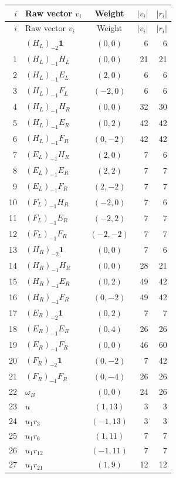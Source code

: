 \begingroup\small
\begin{longtable}{@{}rlcrr@{}}
\toprule $i$&Raw vector $v_i$&Weight&$|v_i|$&$|r_i|$\\\midrule\endfirsthead
\toprule $i$&Raw vector $v_i$&Weight&$|v_i|$&$|r_i|$\\\midrule\endhead
\bottomrule\endfoot
0 & $(H_L)_{-2}\mathbf1$ & $(0,0)$ & 6 & 6\\
1 & $(H_L)_{-1}H_L$ & $(0,0)$ & 21 & 21\\
2 & $(H_L)_{-1}E_L$ & $(2,0)$ & 6 & 6\\
3 & $(H_L)_{-1}F_L$ & $(-2,0)$ & 6 & 6\\
4 & $(H_L)_{-1}H_R$ & $(0,0)$ & 32 & 30\\
5 & $(H_L)_{-1}E_R$ & $(0,2)$ & 42 & 42\\
6 & $(H_L)_{-1}F_R$ & $(0,-2)$ & 42 & 42\\
7 & $(E_L)_{-1}H_R$ & $(2,0)$ & 7 & 6\\
8 & $(E_L)_{-1}E_R$ & $(2,2)$ & 7 & 7\\
9 & $(E_L)_{-1}F_R$ & $(2,-2)$ & 7 & 7\\
10 & $(F_L)_{-1}H_R$ & $(-2,0)$ & 7 & 6\\
11 & $(F_L)_{-1}E_R$ & $(-2,2)$ & 7 & 7\\
12 & $(F_L)_{-1}F_R$ & $(-2,-2)$ & 7 & 7\\
13 & $(H_R)_{-2}\mathbf1$ & $(0,0)$ & 7 & 6\\
14 & $(H_R)_{-1}H_R$ & $(0,0)$ & 28 & 21\\
15 & $(H_R)_{-1}E_R$ & $(0,2)$ & 49 & 42\\
16 & $(H_R)_{-1}F_R$ & $(0,-2)$ & 49 & 42\\
17 & $(E_R)_{-2}\mathbf1$ & $(0,2)$ & 7 & 7\\
18 & $(E_R)_{-1}E_R$ & $(0,4)$ & 26 & 26\\
19 & $(E_R)_{-1}F_R$ & $(0,0)$ & 46 & 60\\
20 & $(F_R)_{-2}\mathbf1$ & $(0,-2)$ & 7 & 42\\
21 & $(F_R)_{-1}F_R$ & $(0,-4)$ & 26 & 26\\
22 & $\omega_B$ & $(0,0)$ & 24 & 26\\
23 & $u$ & $(1,13)$ & 3 & 3\\
24 & $u_1r_{3}$ & $(-1,13)$ & 3 & 3\\
25 & $u_1r_{6}$ & $(1,11)$ & 7 & 7\\
26 & $u_1r_{12}$ & $(-1,11)$ & 7 & 7\\
27 & $u_1r_{21}$ & $(1,9)$ & 12 & 12\\

\end{longtable}
